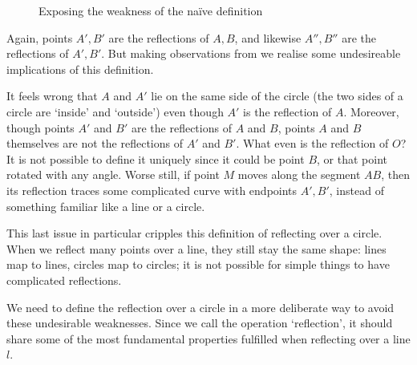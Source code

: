 \documentclass[a4paper, 12pt]{article}
\theoremstyle{definition}
\begin{document}
\begin{figure}[H]
  \begin{center}
    
  \end{center}
  \caption{Exposing the weakness of the naïve definition}
  \label{fig:3}
\end{figure}

\vspace{-1em} Again, points $A', B'$ are the reflections of $A, B$, and likewise $A'', B''$ are the reflections of $A', B'$.
But making observations from  we realise some undesireable implications of this definition.

It feels wrong that $A$ and $A'$ lie on the same side of the circle (the two sides of a circle are `inside' and `outside') even though $A'$ is the reflection of $A$.
Moreover, though points $A'$ and $B'$ are the reflections of $A$ and $B$, points $A$ and $B$ themselves are not the reflections of $A'$ and $B'$.
What even is the reflection of $O$?
It is not possible to define it uniquely since it could be point $B$, or that point rotated with any angle.
Worse still, if point $M$ moves along the segment $AB$, then its reflection traces some complicated curve with endpoints $A', B'$, instead of something familiar like a line or a circle.

This last issue in particular cripples this definition of reflecting over a circle.
When we reflect many points over a line, they still stay the same shape:
lines map to lines, circles map to circles; it is not possible for simple things to have complicated reflections.

We need to define the reflection over a circle in a more deliberate way to avoid these undesirable weaknesses.
Since we call the operation `reflection', it should share some of the most fundamental properties fulfilled when reflecting over a line $l$.

\vspace{-1em}
\end{document}
